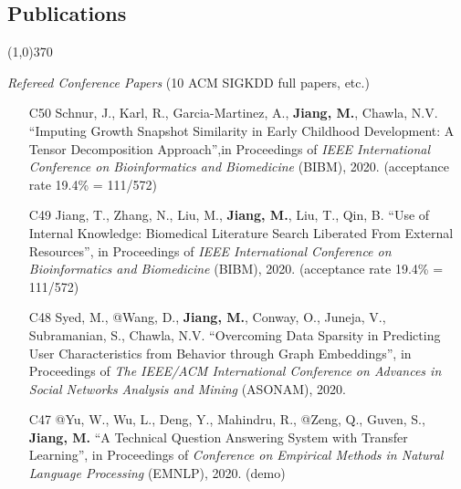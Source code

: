 \documentclass[10pt]{article}
\newenvironment{myindentpar}[1]%
{\begin{list}{}%
         {\setlength{\leftmargin}{#1}}%
         \item[]%
}
{\end{list}}
\newcounter{list}
\begin{document}
\newpage

\vspace{-0.6cm}
\subsection{}
\subsection{\sc Publications}
\vspace{-0.4cm} \line(1,0){370} \vspace{-0.1cm}

\begin{myindentpar}{0.00cm}

\hspace{-0.25cm}\textit{Refereed Conference Papers} {\small (10 ACM SIGKDD full papers, etc.)}

\begin{enumerate}[leftmargin=.5cm]

\item[C50] Schnur, J., Karl, R., Garcia-Martinez, A., \textbf{Jiang, M.}, Chawla, N.V. ``Imputing Growth Snapshot Similarity in Early Childhood Development: A Tensor Decomposition Approach'',in Proceedings of \textit{IEEE International Conference on Bioinformatics and Biomedicine} (BIBM), 2020. (acceptance rate 19.4\% = 111/572)

\item[C49] Jiang, T., Zhang, N., Liu, M., \textbf{Jiang, M.}, Liu, T., Qin, B. ``Use of Internal Knowledge: Biomedical Literature Search Liberated From External Resources'', in Proceedings of \textit{IEEE International Conference on Bioinformatics and Biomedicine} (BIBM), 2020. (acceptance rate 19.4\% = 111/572)

\item[C48] Syed, M., @Wang, D., \textbf{Jiang, M.}, Conway, O., Juneja, V., Subramanian, S., Chawla, N.V. ``Overcoming Data Sparsity in Predicting User Characteristics from Behavior through Graph Embeddings'', in Proceedings of \textit{The IEEE/ACM International Conference on Advances in Social Networks Analysis and Mining} (ASONAM), 2020.

\item[C47] @Yu, W., Wu, L., Deng, Y., Mahindru, R., @Zeng, Q., Guven, S., \textbf{Jiang, M.} ``A Technical Question Answering System with Transfer Learning'', in Proceedings of \textit{Conference on Empirical Methods in Natural Language Processing} (EMNLP), 2020. (demo)
		

\end{enumerate}
\end{myindentpar}
\end{document}
